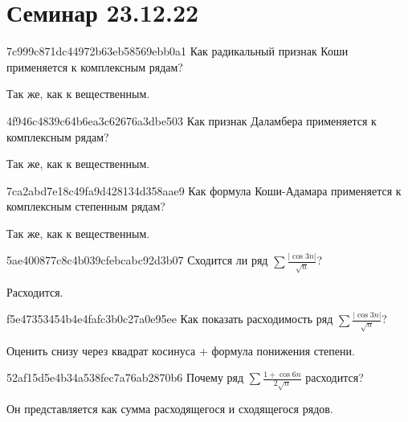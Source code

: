 \section{Семинар 23.12.22}
\begin{note}{7c999c871dc44972b63eb58569ebb0a1}
    Как радикальный признак Коши применяется к комплексным рядам?

    \begin{cloze}{1}
        Так же, как к вещественным.
    \end{cloze}
\end{note}

\begin{note}{4f946c4839c64b6ea3c62676a3dbe503}
    Как признак Даламбера применяется к комплексным рядам?

    \begin{cloze}{1}
        Так же, как к вещественным.
    \end{cloze}
\end{note}

\begin{note}{7ca2abd7e18c49fa9d428134d358aae9}
    Как формула Коши-Адамара применяется к комплексным степенным рядам?

    \begin{cloze}{1}
        Так же, как к вещественным.
    \end{cloze}
\end{note}

\begin{note}{5ae400877c8c4b039cfebcabc92d3b07}
    Сходится ли ряд \({ \sum \frac{\left\lvert \cos 3n \right\rvert}{\sqrt{n}} }\)?

    \begin{cloze}{1}
        Расходится.
    \end{cloze}
\end{note}

\begin{note}{f5e47353454b4e4fafc3b0c27a0e95ee}
    Как показать расходимость ряд \({ \sum \frac{\left\lvert \cos 3n \right\rvert}{\sqrt{n}} }\)?

    \begin{cloze}{1}
        Оценить снизу через квадрат косинуса + формула понижения степени.
    \end{cloze}
\end{note}

\begin{note}{52af15d5e4b34a538fec7a76ab2870b6}
    Почему ряд \({ \sum \frac{1 + \cos 6n}{2 \sqrt{n}} }\) расходится?

    \begin{cloze}{1}
        Он представляется как сумма расходящегося и сходящегося рядов.
    \end{cloze}
\end{note}

